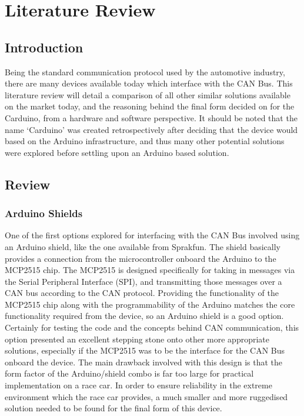 \section{Literature Review}
\subsection{Introduction}
Being the standard communication protocol used by the automotive industry, there are many devices available today which interface with the CAN Bus. This literature review will detail a comparison of all other similar solutions available on the market today, and the reasoning behind the final form decided on for the Carduino, from a hardware and software perspective. It should be noted that the name `Carduino' was created retrospectively after deciding that the device would based on the Arduino infrastructure, and thus many other potential solutions were explored before settling upon an Arduino based solution.

\subsection{Review}
\subsubsection{Arduino Shields}
One of the first options explored for interfacing with the CAN Bus involved using an Arduino shield, like the one available from Sprakfun\cite{CAN_arduinoshield}. The shield basically provides a connection from the microcontroller onboard the Arduino to the MCP2515 chip. The MCP2515 is designed specifically for taking in messages via the Serial Peripheral Interface (SPI), and transmitting those messages over a CAN bus according to the CAN protocol\cite{MCP2515_datasheet}. Providing the functionality of the MCP2515 chip along with the programmability of the Arduino matches the core functionality required from the device, so an Arduino shield is a good option. Certainly for testing the code and the concepts behind CAN communication, this option presented an excellent stepping stone onto other more appropriate solutions, especially if the MCP2515 was to be the interface for the CAN Bus onboard the device. The main drawback involved with this design is that the form factor of the Arduino/shield combo is far too large for practical implementation on a race car. In order to ensure reliability in the extreme environment which the race car provides, a much smaller and more ruggedised solution needed to be found for the final form of this device.

